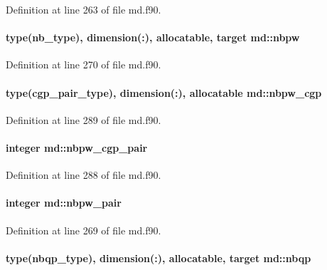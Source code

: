 Definition at line 263 of file md.\-f90.

\hypertarget{classmd_acdc177734b28c55ef6c7f3d93703f6e0}{
\paragraph[{nbpw}]{\setlength{\rightskip}{0pt plus 5cm}type({\bf nb\-\_\-type}), dimension(\-:), allocatable, target md\-::nbpw}}\label{classmd_acdc177734b28c55ef6c7f3d93703f6e0}


Definition at line 270 of file md.\-f90.

\hypertarget{classmd_afb029767cdf177966fd8074ab061d39c}{
\paragraph[{nbpw\-\_\-cgp}]{\setlength{\rightskip}{0pt plus 5cm}type({\bf cgp\-\_\-pair\-\_\-type}), dimension(\-:), allocatable md\-::nbpw\-\_\-cgp}}\label{classmd_afb029767cdf177966fd8074ab061d39c}


Definition at line 289 of file md.\-f90.

\hypertarget{classmd_a7ec7cb1c5afce9586baea890420e654a}{
\paragraph[{nbpw\-\_\-cgp\-\_\-pair}]{\setlength{\rightskip}{0pt plus 5cm}integer md\-::nbpw\-\_\-cgp\-\_\-pair}}\label{classmd_a7ec7cb1c5afce9586baea890420e654a}


Definition at line 288 of file md.\-f90.

\hypertarget{classmd_ac187aeca7638bc332f2744243e84444a}{
\paragraph[{nbpw\-\_\-pair}]{\setlength{\rightskip}{0pt plus 5cm}integer md\-::nbpw\-\_\-pair}}\label{classmd_ac187aeca7638bc332f2744243e84444a}


Definition at line 269 of file md.\-f90.

\hypertarget{classmd_a0caebab269d51bb189aa2740107013ce}{
\paragraph[{nbqp}]{\setlength{\rightskip}{0pt plus 5cm}type({\bf nbqp\-\_\-type}), dimension(\-:), allocatable, target md\-::nbqp}}\label{classmd_a0caebab269d51bb189aa2740107013ce}


